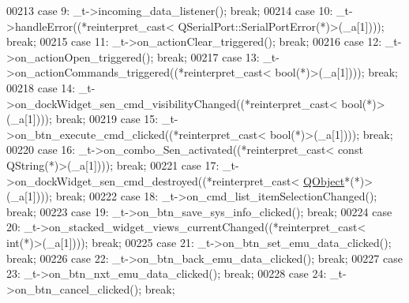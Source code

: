 \begin{DoxyCode}
00213         \textcolor{keywordflow}{case} 9: \_t->incoming\_data\_listener(); \textcolor{keywordflow}{break};
00214         \textcolor{keywordflow}{case} 10: \_t->handleError((*\textcolor{keyword}{reinterpret\_cast<} QSerialPort::SerialPortError(*)\textcolor{keyword}{>}(\_a[1]))); \textcolor{keywordflow}{break};
00215         \textcolor{keywordflow}{case} 11: \_t->on\_actionClear\_triggered(); \textcolor{keywordflow}{break};
00216         \textcolor{keywordflow}{case} 12: \_t->on\_actionOpen\_triggered(); \textcolor{keywordflow}{break};
00217         \textcolor{keywordflow}{case} 13: \_t->on\_actionCommands\_triggered((*\textcolor{keyword}{reinterpret\_cast<} \textcolor{keywordtype}{bool}(*)\textcolor{keyword}{>}(\_a[1]))); \textcolor{keywordflow}{break};
00218         \textcolor{keywordflow}{case} 14: \_t->on\_dockWidget\_sen\_cmd\_visibilityChanged((*\textcolor{keyword}{reinterpret\_cast<} \textcolor{keywordtype}{bool}(*)\textcolor{keyword}{>}(\_a[1]))); \textcolor{keywordflow}{break};
00219         \textcolor{keywordflow}{case} 15: \_t->on\_btn\_execute\_cmd\_clicked((*\textcolor{keyword}{reinterpret\_cast<} \textcolor{keywordtype}{bool}(*)\textcolor{keyword}{>}(\_a[1]))); \textcolor{keywordflow}{break};
00220         \textcolor{keywordflow}{case} 16: \_t->on\_combo\_Sen\_activated((*\textcolor{keyword}{reinterpret\_cast<} \textcolor{keyword}{const }QString(*)\textcolor{keyword}{>}(\_a[1]))); \textcolor{keywordflow}{break};
00221         \textcolor{keywordflow}{case} 17: \_t->on\_dockWidget\_sen\_cmd\_destroyed((*\textcolor{keyword}{reinterpret\_cast<} \hyperlink{a00059}{QObject}*(*)\textcolor{keyword}{>}(\_a[1]))); \textcolor{keywordflow}{
      break};
00222         \textcolor{keywordflow}{case} 18: \_t->on\_cmd\_list\_itemSelectionChanged(); \textcolor{keywordflow}{break};
00223         \textcolor{keywordflow}{case} 19: \_t->on\_btn\_save\_sys\_info\_clicked(); \textcolor{keywordflow}{break};
00224         \textcolor{keywordflow}{case} 20: \_t->on\_stacked\_widget\_views\_currentChanged((*\textcolor{keyword}{reinterpret\_cast<} \textcolor{keywordtype}{int}(*)\textcolor{keyword}{>}(\_a[1]))); \textcolor{keywordflow}{break};
00225         \textcolor{keywordflow}{case} 21: \_t->on\_btn\_set\_emu\_data\_clicked(); \textcolor{keywordflow}{break};
00226         \textcolor{keywordflow}{case} 22: \_t->on\_btn\_back\_emu\_data\_clicked(); \textcolor{keywordflow}{break};
00227         \textcolor{keywordflow}{case} 23: \_t->on\_btn\_nxt\_emu\_data\_clicked(); \textcolor{keywordflow}{break};
00228         \textcolor{keywordflow}{case} 24: \_t->on\_btn\_cancel\_clicked(); \textcolor{keywordflow}{break};

\end{DoxyCode}
